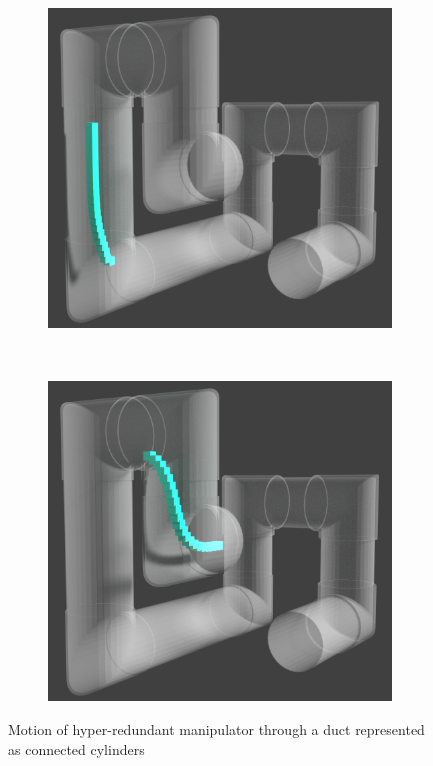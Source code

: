 \documentclass[12pt,a4]{article}
\begin{document}
\begin{figure}[ht!]
\begin{subfigure}{0.31\textwidth}
    \end{subfigure}%
    ~
        \begin{subfigure}{0.31\textwidth}
        \centering
        \includegraphics[width=0.8\linewidth]{figures/Pipesnaps/5.png}
      
    \end{subfigure}%
    ~
        \begin{subfigure}{0.31\textwidth}
        \centering
        \includegraphics[width=0.8\linewidth]{figures/Pipesnaps/6.png}
        
    \end{subfigure}%
    
    \caption{ Motion of hyper-redundant manipulator through a duct represented as connected cylinders\label{fig:pipelinemotion}}
\end{figure}
\end{document}
